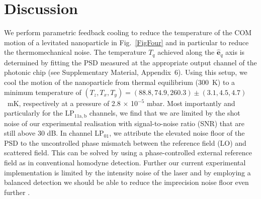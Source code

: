 \documentclass[%
 reprint,
 amsmath,amssymb,
 aps,
pra,
]{revtex4-2}
\begin{document}
\section{Discussion}

We perform parametric feedback cooling to reduce the temperature of the COM motion of a levitated nanoparticle in Fig.~\ref{FigFour} and in particular to reduce the thermomechanical noise. The temperature $T_{q}$ achieved along the $\hat{\boldsymbol{e}}_{q}$ axis is determined by fitting the PSD measured at the appropriate output channel of the photonic chip (see Supplementary Material, Appendix~6). Using this setup, we cool the motion of the nanoparticle from thermal equilibrium ($300$~K) to a minimum temperature of ${(T_{z}, T_{x}, T_{y}) = (88.8, 74.9, 260.3)\pm(3.1, 4.5, 4.7)}$~mK, respectively at a pressure of 2.8 $\times$ 10$^{-5}$ mbar. Most importantly and particularly for the LP$_{11\mathrm{a,b}}$ channels, we find that we are limited by the shot noise of our experimental realisation with signal-to-noise ratio (SNR) that are still above 30 dB. In channel LP$_{01}$, we attribute the elevated noise floor of the PSD to the uncontrolled phase mismatch between the reference field (LO) and scattered field. This can be solved by using a phase-controlled external reference field as in conventional homodyne detection. Further our current experimental implementation is limited by the intensity noise of the laser and by employing a balanced detection we should be able to reduce the imprecision noise floor even further \cite{rashid_wigner_2017}.
\end{document}
